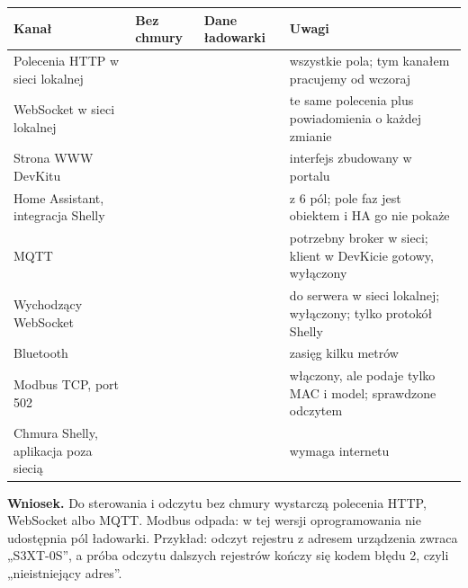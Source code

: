 \documentclass[11pt,a4paper]{article}
\begin{document}
\begin{longtable}{>{\raggedright\arraybackslash}p{3.91cm}>{\raggedright\arraybackslash}p{1.30cm}>{\raggedright\arraybackslash}p{1.82cm}>{\raggedright\arraybackslash}p{7.80cm}}
\toprule
\rowcolor{apteallight}\textbf{Kanał} & \textbf{Bez chmury} & \textbf{Dane ładowarki} & \textbf{Uwagi} \\
\midrule\endhead
\bottomrule\endfoot
Polecenia HTTP w sieci lokalnej & \leavevmode{\symbolfont\color{apgreen}\textbf{✔}} & \leavevmode{\symbolfont\color{apgreen}\textbf{✔}} & wszystkie pola; tym kanałem pracujemy od wczoraj \\
WebSocket w sieci lokalnej & \leavevmode{\symbolfont\color{apgreen}\textbf{✔}} & \leavevmode{\symbolfont\color{apgreen}\textbf{✔}} & te same polecenia plus powiadomienia o każdej zmianie \\
Strona WWW DevKitu & \leavevmode{\symbolfont\color{apgreen}\textbf{✔}} & \leavevmode{\symbolfont\color{apgreen}\textbf{✔}} & interfejs zbudowany w portalu \\
Home Assistant, integracja Shelly & \leavevmode{\symbolfont\color{apgreen}\textbf{✔}} & \leavevmode{\symbolfont\color{apamber}\textbf{◐}} & 5 z 6 pól; pole faz jest obiektem i HA go nie pokaże \\
MQTT & \leavevmode{\symbolfont\color{apgreen}\textbf{✔}} & \leavevmode{\symbolfont\color{apgreen}\textbf{✔}} & potrzebny broker w sieci; klient w DevKicie gotowy, wyłączony \\
Wychodzący WebSocket & \leavevmode{\symbolfont\color{apgreen}\textbf{✔}} & \leavevmode{\symbolfont\color{apgreen}\textbf{✔}} & do serwera w sieci lokalnej; wyłączony; tylko protokół Shelly \\
Bluetooth & \leavevmode{\symbolfont\color{apgreen}\textbf{✔}} & \leavevmode{\symbolfont\color{apgreen}\textbf{✔}} & zasięg kilku metrów \\
Modbus TCP, port 502 & \leavevmode{\symbolfont\color{apgreen}\textbf{✔}} & \leavevmode{\symbolfont\color{apred}\textbf{✘}} & włączony, ale podaje tylko MAC i model; sprawdzone odczytem \\
Chmura Shelly, aplikacja poza siecią & \leavevmode{\symbolfont\color{apred}\textbf{✘}} & \leavevmode{\symbolfont\color{apgreen}\textbf{✔}} & wymaga internetu \\
\end{longtable}

\textbf{Wniosek.} Do sterowania i odczytu bez chmury wystarczą polecenia HTTP, WebSocket albo MQTT. Modbus odpada: w tej wersji oprogramowania nie udostępnia pól ładowarki. Przykład: odczyt rejestru z adresem urządzenia zwraca „S3XT-0S”, a próba odczytu dalszych rejestrów kończy się kodem błędu 2, czyli „nieistniejący adres”.
\end{document}

